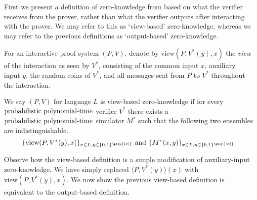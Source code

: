 First we present a definition of zero-knowledge from \cite{GO90} based on what the verifier receives from the prover, rather than what the verifier outputs after interacting with the prover.
We may refer to this as `view-based' zero-knowledge, whereas we may refer to the previous definitions as `output-based' zero-knowledge.

\begin{definition}
    For an interactive proof system $(P,V)$, denote by $\text{view}(P, V^*(y), x)$ the \emph{view} of the interaction as seen by $V^*$, consisting of the common input $x$, auxiliary input $y$, the random coins of $V^*$, and all messages sent from $P$ to $V^*$ throughout the interaction.

    We say $(P,V)$ for language $L$ is view-based zero-knowledge if for every $\text{probabilistic polynomial-time}$ verifier $V^*$ there exists a $\text{probabilistic polynomial-time}$ simulator $M^*$ such that the following two ensembles are indistinguishable.
    \begin{equation}
         \{ \text{view}(P, V^*(y), x) \}_{x\in L, y\in\{0,1\}^{\poly{|x|}}}
        \text{ and }
        \{ M^*(x,y) \}_{x\in L, y\in\{0,1\}^{\poly{|x|}}}
    \end{equation}
\end{definition}

Observe how the view-based definition is a simple modification of auxiliary-input zero-knowledge.
We have simply replaced $\langle P, V^*(y) \rangle(x)$ with $\text{view}(P, V^*(y), x)$.
We now show the previous view-based definition is equivalent to the output-based definition.

